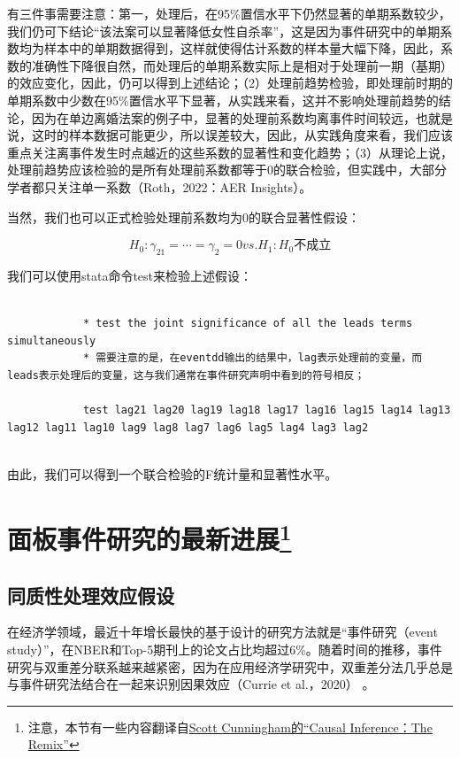 \documentclass[cn,12pt,math=newtx,citestyle=gb7714-2015,bibstyle=gb7714-2015]{elegantbook}
\begin{document}
	    有三件事需要注意：第一，处理后，在95\%置信水平下仍然显著的单期系数较少，我们仍可下结论“该法案可以显著降低女性自杀率”，这是因为事件研究中的单期系数均为样本中的单期数据得到，这样就使得估计系数的样本量大幅下降，因此，系数的准确性下降很自然，而处理后的单期系数实际上是相对于处理前一期（基期）的效应变化，因此，仍可以得到上述结论；（2）处理前趋势检验，即处理前时期的单期系数中少数在95\%置信水平下显著，从实践来看，这并不影响处理前趋势的结论，因为在单边离婚法案的例子中，显著的处理前系数均离事件时间较远，也就是说，这时的样本数据可能更少，所以误差较大，因此，从实践角度来看，我们应该重点关注离事件发生时点越近的这些系数的显著性和变化趋势；（3）从理论上说，处理前趋势应该检验的是所有处理前系数都等于0的联合检验，但实践中，大部分学者都只关注单一系数（Roth，2022：AER Insights）。
	    
	    当然，我们也可以正式检验处理前系数均为0的联合显著性假设：
	    
	    $$H_0: \gamma_{21}= \cdots = \gamma_2=0   vs.   H_1: H_0 不成立$$
	    
	    我们可以使用stata命令test来检验上述假设：
	    
	    \begin{lstlisting}
	    	
	    	* test the joint significance of all the leads terms simultaneously
	    	* 需要注意的是，在eventdd输出的结果中，lag表示处理前的变量，而leads表示处理后的变量，这与我们通常在事件研究声明中看到的符号相反；
	    	
	    	test lag21 lag20 lag19 lag18 lag17 lag16 lag15 lag14 lag13 lag12 lag11 lag10 lag9 lag8 lag7 lag6 lag5 lag4 lag3 lag2
	    	
	    \end{lstlisting}
	    
	    由此，我们可以得到一个联合检验的F统计量和显著性水平。
	    
	    
	    \section{面板事件研究的最新进展\footnote{注意，本节有一些内容翻译自\href{https://causalinf.substack.com/}{Scott Cunningham的“Causal Inference：The Remix”}}}
	    
	    \subsection{同质性处理效应假设}
	    
	    在经济学领域，最近十年增长最快的基于设计的研究方法就是“事件研究（event study）”，在NBER和Top-5期刊上的论文占比均超过6\%。随着时间的推移，事件研究与双重差分联系越来越紧密，因为在应用经济学研究中，双重差分法几乎总是与事件研究法结合在一起来识别因果效应（Currie et al.，2020） 。
	    
\end{document}
